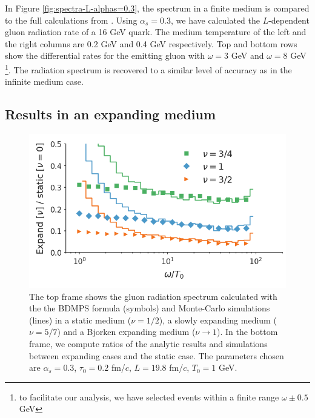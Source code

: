 \documentclass[aps, prc, reprint, amsmath, groupedaddress, nofootinbib]{revtex4-1}
\begin{document}
In Figure \ref{fig:spectra-L-alphas=0.3}, the spectrum in a finite medium is compared to the full calculations from \cite{CaronHuot:2010bp}.
Using $\alpha_s = 0.3$, we have calculated the $L$-dependent gluon radiation rate of a 16 GeV quark.
The medium temperature of the left and the right columns are 0.2 GeV and 0.4 GeV respectively.
Top and bottom rows show the differential rates for the emitting gluon with $\omega = 3$ GeV and $\omega = 8$ GeV \footnote{to facilitate our analysis, we have selected events within a finite range $\omega\pm 0.5$ GeV}.
The radiation spectrum is recovered to a similar level of accuracy as in the infinite medium case.

\subsection{Results in an expanding medium}
\begin{figure}
\includegraphics[width=\columnwidth]{spectrum_Bjorken.png}
\caption{The top frame shows the gluon radiation spectrum calculated with the the BDMPS formula (symbols) and Monte-Carlo simulations (lines) in a static medium ($\nu=1/2$), a slowly expanding medium ($\nu=5/7$) and a Bjorken expanding medium ($\nu\rightarrow 1$). In the bottom frame, we compute ratios of the analytic results and simulations between expanding cases and the static case. The parameters chosen are $\alpha_s=0.3$, $\tau_0 = 0.2$ fm/$c$, $L = 19.8$ fm/$c$, $T_0 = 1$ GeV.}
\label{fig:Bjorken-BDMPS}
\end{figure}
\end{document}
